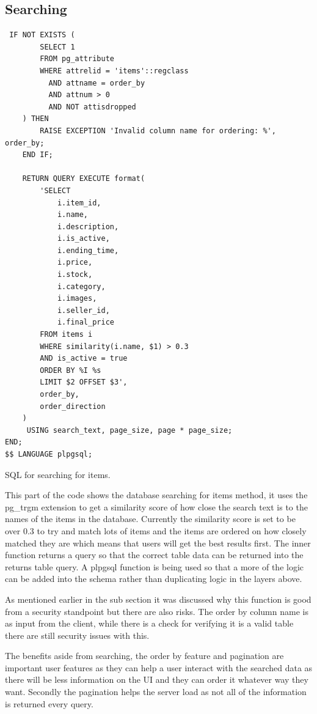 \documentclass[]{project_report}
\begin{document}
\subsection{Searching}

\begin{codeblock}[H]
    \begin{verbatim}
 IF NOT EXISTS (
        SELECT 1
        FROM pg_attribute
        WHERE attrelid = 'items'::regclass
          AND attname = order_by
          AND attnum > 0
          AND NOT attisdropped
    ) THEN
        RAISE EXCEPTION 'Invalid column name for ordering: %', order_by;
    END IF;

    RETURN QUERY EXECUTE format(
        'SELECT
            i.item_id, 
            i.name, 
            i.description,
            i.is_active,
            i.ending_time,
            i.price,
            i.stock,
            i.category,
            i.images,
            i.seller_id,
            i.final_price
        FROM items i
        WHERE similarity(i.name, $1) > 0.3
        AND is_active = true
        ORDER BY %I %s
        LIMIT $2 OFFSET $3', 
        order_by,
        order_direction
    )
     USING search_text, page_size, page * page_size;
END;
$$ LANGUAGE plpgsql;
\end{verbatim}
    \caption{SQL for searching for items.}
    \label{code:search-for-items}
\end{codeblock}

This part of the code shows the database searching for items method, it uses the pg\_trgm extension to get a similarity score of how close the search text is to the names of the items in the database. Currently the similarity score is set to be over 0.3 to try and match lots of items and the items are ordered on how closely matched they are which means that users will get the best results first. The inner function returns a query so that the correct table data can be returned into the returns table query. A plpgsql function is being used so that a more of the logic can be added into the schema rather than duplicating logic in the layers above. 

As mentioned earlier in the  sub section it was discussed why this function is good from a security standpoint but there are also risks. The order by column name is as input from the client, while there is a check for verifying it is a valid table there are still security issues with this. 

The benefits aside from searching, the order by feature and pagination are important user features as they can help a user interact with the searched data as there will be less information on the UI and they can order it whatever way they want. Secondly the pagination helps the server load as not all of the information is returned every query.
\end{document}
